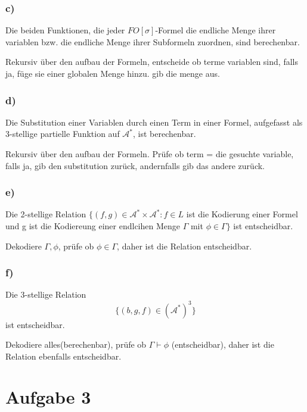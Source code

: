 \documentclass[12pt]{article}
\begin{document}
\subsubsection*{c)}
Die beiden Funktionen, die jeder $FO[\sigma]$-Formel die endliche Menge ihrer variablen bzw. die endliche Menge ihrer Subformeln zuordnen, sind berechenbar.

Rekursiv über den aufbau der Formeln, entscheide ob terme variablen sind, falls ja, füge sie einer globalen Menge hinzu. gib die menge aus.

\subsubsection*{d)}
Die Substitution einer Variablen durch einen Term in einer Formel, aufgefasst
als 3-stellige partielle Funktion auf $\mathcal{A}^*$, ist berechenbar.

Rekursiv über den aufbau der Formeln. Prüfe ob term = die gesuchte variable, falls ja,
gib den substitution zurück, andernfalls gib das andere zurück.

\subsubsection*{e)}
Die 2-stellige Relation 
$\{(f,g)\in \mathcal{A}^*\times \mathcal{A}^*:f\in L$ ist die Kodierung einer Formel und g ist die Kodiereung einer endlcihen Menge $\Gamma$ mit $\phi\in\Gamma \} $
ist entscheidbar.

Dekodiere $\Gamma,\phi$, prüfe ob $\phi\in\Gamma$, daher ist die Relation entscheidbar.

\subsubsection*{f)}
Die 3-stellige Relation
\[ \{(b,g,f)\in (\mathcal{A}^*)^3\} \]
ist entscheidbar.

Dekodiere alles(berechenbar), prüfe ob $\Gamma\vdash\phi$ (entscheidbar), daher ist die Relation ebenfalls entscheidbar.
\section*{Aufgabe 3}
\end{document}
